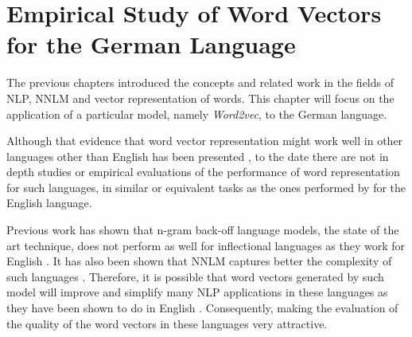\chapter{Empirical Study of Word Vectors for the German Language}
\label{chapter:wor2vec_german}











The previous chapters introduced the concepts and related work  in the fields
of  \ac{NLP}, \ac{NNLM} and vector representation of words. This chapter will
focus on the application of a particular model, namely \textit{Word2vec}, to
the German language.  


Although that  evidence that word vector representation might work
well in other languages other than English has been presented
\cite{DBLP:journals/corr/MikolovLS13}, to the date  there are not in depth studies or empirical evaluations of the
performance of word representation for such languages,  in similar or equivalent tasks as the
ones performed by \cite{DBLP:journals/corr/abs-1301-3781} for the English
language. 

Previous work has shown that  n-gram back-off language models, the state of the art
technique, does not perform  as well for inflectional  languages as they work
for English \cite{conf/icassp/MikolovKBGC09}.  It has also been shown that
\ac{NNLM} captures  better the complexity of such languages
\cite{conf/icassp/MikolovKBGC09}\cite{DBLP:journals/corr/MikolovLS13}.
Therefore, it is possible that word vectors generated by such model  will 
improve  and simplify many \ac{NLP} applications in
these languages as they have been shown to do in
English \cite{collobert:2008} \cite{Turian:2010:WRS:1858681.1858721}.
Consequently, making the evaluation of the quality of the word vectors in
these languages very attractive.

